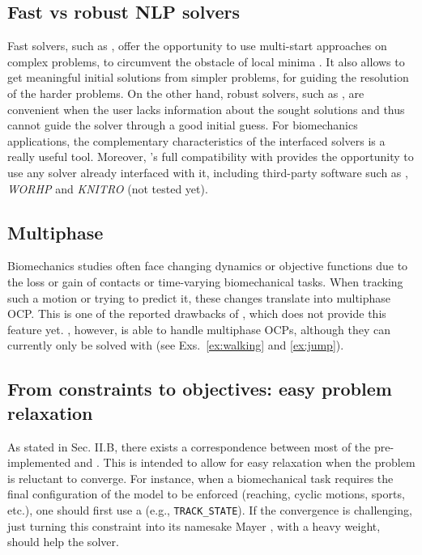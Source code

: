 \subsection{Fast vs robust NLP solvers}

Fast solvers, such as \acados, offer the opportunity to use multi-start approaches on complex problems, to circumvent the obstacle of local minima \cite{huchez2015local, bailly2020optimal}.
It also allows to get meaningful initial solutions from simpler problems, for guiding the resolution of the harder problems.
On the other hand, robust solvers, such as \ipopt, are convenient when the user lacks information about the sought solutions and thus cannot guide the solver through a good initial guess.
For biomechanics applications, the complementary characteristics of the interfaced solvers is a really useful tool.
Moreover, \bioptim's full compatibility with \casadi provides the opportunity to use any solver already interfaced with it, including third-party software such as \snopt, \textit{WORHP} \cite{wassel2013exploring} and \textit{KNITRO} \cite{nocedal2006knitro} (not tested yet). 

\subsection{Multiphase}

Biomechanics studies often face changing dynamics or objective functions due to the loss or gain of contacts or time-varying biomechanical tasks.
When tracking such a motion or trying to predict it, these changes translate into multiphase OCP.
This is one of the reported drawbacks of \moco, which does not provide this feature yet.
\bioptim, however, is able to handle multiphase OCPs, although they can currently only be solved with \ipopt (see Exs.~\ref{ex:walking} and \ref{ex:jump}).


\subsection{From constraints to objectives: easy problem relaxation}

As stated in Sec. II.B, there exists a correspondence between most of the pre-implemented \constraints and \objectives.
This is intended to allow for easy relaxation when the problem is reluctant to converge. 
For instance, when a biomechanical task requires the final configuration of the model to be enforced (reaching, cyclic motions, sports, etc.), one should first use a \constraint (e.g., \texttt{TRACK\_STATE}).
If the convergence is challenging, just turning this constraint into its namesake Mayer \objective, with a heavy weight, should help the solver.

